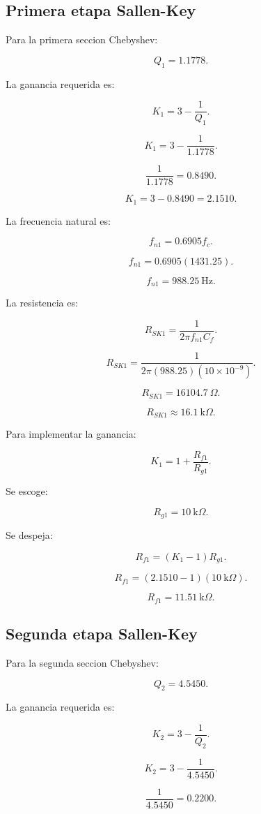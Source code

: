 \documentclass[11pt,letterpaper]{article}
\begin{document}
\subsection{Primera etapa Sallen-Key}

Para la primera seccion Chebyshev:

\[
Q_1=1.1778.
\]

La ganancia requerida es:

\[
K_1=3-\frac{1}{Q_1}.
\]

\[
K_1=3-\frac{1}{1.1778}.
\]

\[
\frac{1}{1.1778}=0.8490.
\]

\[
K_1=3-0.8490=2.1510.
\]

La frecuencia natural es:

\[
f_{n1}=0.6905f_c.
\]

\[
f_{n1}=0.6905(1431.25).
\]

\[
f_{n1}=988.25~\text{Hz}.
\]

La resistencia es:

\[
R_{SK1}=
\frac{1}{2\pi f_{n1}C_f}.
\]

\[
R_{SK1}=
\frac{1}
{2\pi(988.25)(10\times 10^{-9})}.
\]

\[
R_{SK1}=16104.7~\Omega.
\]

\[
\boxed{R_{SK1}\approx 16.1~\text{k}\Omega}.
\]

Para implementar la ganancia:

\[
K_1=1+\frac{R_{f1}}{R_{g1}}.
\]

Se escoge:

\[
R_{g1}=10~\text{k}\Omega.
\]

Se despeja:

\[
R_{f1}=(K_1-1)R_{g1}.
\]

\[
R_{f1}=(2.1510-1)(10~\text{k}\Omega).
\]

\[
R_{f1}=11.51~\text{k}\Omega.
\]

\subsection{Segunda etapa Sallen-Key}

Para la segunda seccion Chebyshev:

\[
Q_2=4.5450.
\]

La ganancia requerida es:

\[
K_2=3-\frac{1}{Q_2}.
\]

\[
K_2=3-\frac{1}{4.5450}.
\]

\[
\frac{1}{4.5450}=0.2200.
\]
\end{document}
